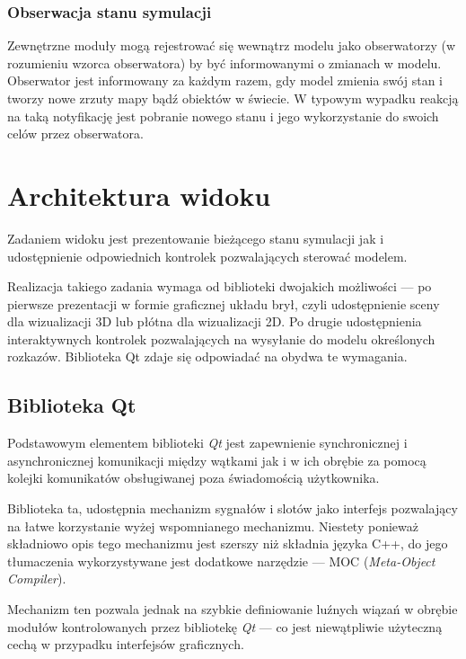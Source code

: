 {{{\subsubsection{Obserwacja stanu symulacji}
\par{
Zewnętrzne moduły mogą rejestrować się wewnątrz modelu jako obserwatorzy (w rozumieniu wzorca obserwatora) by być informowanymi o zmianach w modelu. Obserwator jest informowany za każdym razem, gdy model zmienia swój stan i tworzy nowe zrzuty mapy bądź obiektów w świecie. W typowym wypadku reakcją na taką notyfikację jest pobranie nowego stanu i jego wykorzystanie do swoich celów przez obserwatora.
}

\section[Architektura widoku][Architektura widoku]{Architektura widoku}
\par{
Zadaniem widoku jest prezentowanie bieżącego stanu symulacji jak i udostępnienie odpowiednich kontrolek pozwalających sterować modelem.
}
\par{
Realizacja takiego zadania wymaga od biblioteki dwojakich możliwości --- po pierwsze prezentacji w formie graficznej układu brył, czyli udostępnienie sceny dla wizualizacji 3D lub płótna dla wizualizacji 2D. Po drugie udostępnienia interaktywnych kontrolek pozwalających na wysyłanie do modelu określonych rozkazów. Biblioteka Qt zdaje się odpowiadać na obydwa te wymagania.
}
\subsection{Biblioteka Qt}
\par{
Podstawowym elementem biblioteki \textit{Qt} jest zapewnienie synchronicznej i asynchronicznej komunikacji między wątkami jak i w ich obrębie za pomocą kolejki komunikatów obsługiwanej poza świadomością użytkownika.
}
\par{
Biblioteka ta, udostępnia mechanizm sygnałów i slotów jako interfejs pozwalający na łatwe korzystanie wyżej wspomnianego mechanizmu. Niestety ponieważ składniowo opis tego mechanizmu jest szerszy niż składnia języka C++, do jego tłumaczenia wykorzystywane jest dodatkowe narzędzie --- MOC (\textit{Meta-Object Compiler}).
}
\par{
Mechanizm ten pozwala jednak na szybkie definiowanie luźnych wiązań w obrębie modułów kontrolowanych przez bibliotekę \textit{Qt} --- co jest niewątpliwie użyteczną cechą w przypadku interfejsów graficznych.
}
}}}
